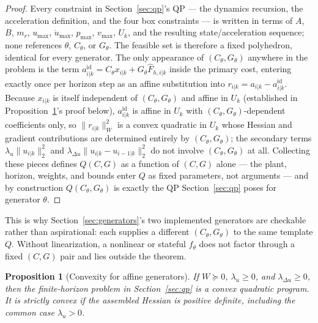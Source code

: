 \documentclass[journal]{IEEEtran}
\newtheorem{proposition}{Proposition}
\begin{document}
\begin{proof}
Every constraint in Section~\ref{sec:qp}'s QP --- the dynamics
recursion, the acceleration definition, and the four box constraints ---
is written in terms of $A$, $B$, $m_r$, $u_{\max}$, $\dot u_{\max}$,
$p_{\max}$, $v_{\max}$, $U_k$, and the resulting state/acceleration
sequence; none references $\theta$, $C_\theta$, or $G_\theta$. The
feasible set is therefore a fixed polyhedron, identical for every
generator. The only appearance of $(C_\theta,G_\theta)$ anywhere in the
problem is the term
$a_{i|k}^{\mathrm{id}}=C_\theta x_{i|k}+G_\theta\hat F_{h,i|k}$ inside the
primary cost, entering exactly once per horizon step as an affine
substitution into $r_{i|k}=a_{i|k}-a_{i|k}^{\mathrm{id}}$. Because
$x_{i|k}$ is itself independent of $(C_\theta,G_\theta)$ and affine in
$U_k$ (established in Proposition~\ref{prop:convexity}'s proof below),
$a_{i|k}^{\mathrm{id}}$ is affine in $U_k$ with
$(C_\theta,G_\theta)$-dependent coefficients only, so $\|r_{i|k}\|_W^2$
is a convex quadratic in $U_k$ whose Hessian and gradient contributions
are determined entirely by $(C_\theta,G_\theta)$; the secondary terms
$\lambda_u\|u_{i|k}\|_2^2$ and
$\lambda_{\Delta u}\|u_{i|k}-u_{i-1|k}\|_2^2$ do not involve
$(C_\theta,G_\theta)$ at all. Collecting these pieces defines $Q(C,G)$
as a function of $(C,G)$ alone --- the plant, horizon, weights, and
bounds enter $Q$ as fixed parameters, not arguments --- and by
construction $Q(C_\theta,G_\theta)$ is exactly the QP
Section~\ref{sec:qp} poses for generator $\theta$.
\end{proof}

This is why Section~\ref{sec:generators}'s two implemented generators
are checkable rather than aspirational: each supplies a different
$(C_\theta,G_\theta)$ to the same template $Q$. Without linearization, a
nonlinear or stateful $f_\theta$ does not factor through a fixed $(C,G)$
pair and lies outside the theorem.

\begin{proposition}[Convexity for affine generators]
\label{prop:convexity}
If $W\succeq0$, $\lambda_u\ge0$, and $\lambda_{\Delta u}\ge0$, then the
finite-horizon problem in Section~\ref{sec:qp} is a convex quadratic
program. It is strictly convex if the assembled Hessian is positive
definite, including the common case $\lambda_u>0$.
\end{proposition}
\end{document}
